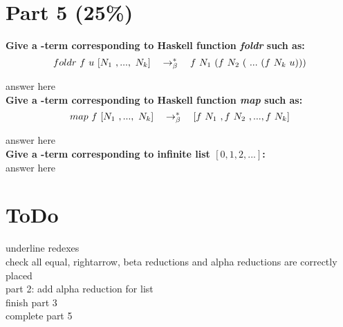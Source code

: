 \documentclass{article}
\begin{document}
	
	
	\section{Part 5 (25\%)}
	
	\begin{Large}
		\textbf{Give a \lamb -term corresponding to Haskell function \textit{foldr} such as:}\\
		
		\begin{equation*}
			foldr \ f \ u \ [N_1 \ ,..., \ N_k] \quad \rightarrow_\beta^*\quad f \ N_1\ (f \ N_2 \ ( \ ... \ (f \ N_k \ u)))
		\end{equation*}
		\newline
		
		answer here\\
		
		\textbf{Give a \lamb -term corresponding to Haskell function \textit{map} such as:}\\
		
		\begin{equation*}
			map \ f \ [N_1\ ,..., \ N_k] \equalsT [f \ N_1 \ , f \ N_2 \ ,...,f \ N_k]
		\end{equation*}
		\newline
		
		answer here\\
		
		\textbf{Give a \lamb -term corresponding to infinite list $[0,1,2,...]$:}\\
		
		answer here
	\end{Large}
	
	
	\newpage
	
	\section{ToDo}
	
	\begin{Large}
		underline redexes\\
		
		check all equal, rightarrow, beta reductions and alpha reductions are correctly placed\\
		
		part 2: add alpha reduction for list\\
		
		finish part 3\\
		
		complete part 5\\
	\end{Large}
\end{document}
